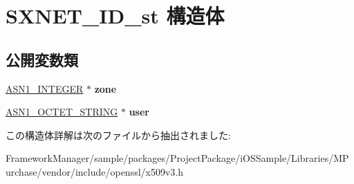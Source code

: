 \hypertarget{struct_s_x_n_e_t___i_d__st}{}\section{S\+X\+N\+E\+T\+\_\+\+I\+D\+\_\+st 構造体}
\label{struct_s_x_n_e_t___i_d__st}
\subsection*{公開変数類}
\begin{DoxyCompactItemize}
\item 
\hypertarget{struct_s_x_n_e_t___i_d__st_a37185a622f9b0cb3e0384652be7b9215}{}\hyperlink{structasn1__string__st}{A\+S\+N1\+\_\+\+I\+N\+T\+E\+G\+E\+R} $\ast$ {\bfseries zone}\label{struct_s_x_n_e_t___i_d__st_a37185a622f9b0cb3e0384652be7b9215}

\item 
\hypertarget{struct_s_x_n_e_t___i_d__st_aa72978d5a59bbe0df0bb2d5190c30348}{}\hyperlink{structasn1__string__st}{A\+S\+N1\+\_\+\+O\+C\+T\+E\+T\+\_\+\+S\+T\+R\+I\+N\+G} $\ast$ {\bfseries user}\label{struct_s_x_n_e_t___i_d__st_aa72978d5a59bbe0df0bb2d5190c30348}

\end{DoxyCompactItemize}


この構造体詳解は次のファイルから抽出されました\+:\begin{DoxyCompactItemize}
\item 
Framework\+Manager/sample/packages/\+Project\+Package/i\+O\+S\+Sample/\+Libraries/\+M\+Purchase/vendor/include/openssl/x509v3.\+h\end{DoxyCompactItemize}
